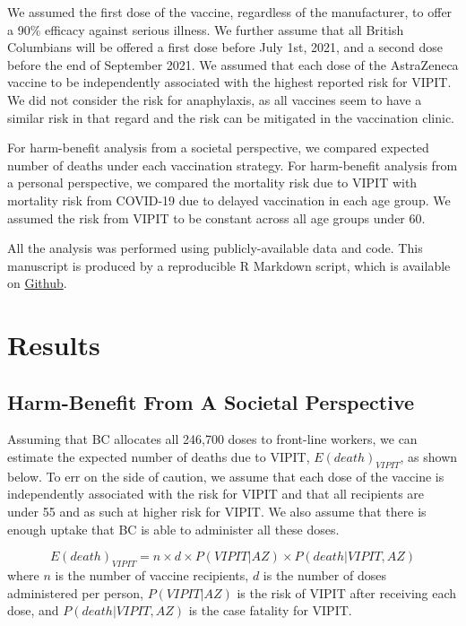 \documentclass[]{interact}
\theoremstyle{plain}%
\theoremstyle{definition}
\theoremstyle{remark}
\begin{document}
We assumed the first dose of the vaccine, regardless of the
manufacturer, to offer a 90\% efficacy against serious illness. We
further assume that all British Columbians will be offered a first dose
before July 1st, 2021, and a second dose before the end of September
2021. We assumed that each dose of the AstraZeneca vaccine to be
independently associated with the highest reported risk for VIPIT. We
did not consider the risk for anaphylaxis, as all vaccines seem to have
a similar risk in that regard and the risk can be mitigated in the
vaccination clinic.

For harm-benefit analysis from a societal perspective, we compared
expected number of deaths under each vaccination strategy. For
harm-benefit analysis from a personal perspective, we compared the
mortality risk due to VIPIT with mortality risk from COVID-19 due to
delayed vaccination in each age group. We assumed the risk from VIPIT to
be constant across all age groups under 60.

All the analysis was performed using publicly-available data and code.
This manuscript is produced by a reproducible R Markdown script, which
is available on
\href{https://github.com/aminadibi/astrazenecaVIPIT}{Github}.

\hypertarget{results}{%
\section{Results}\label{results}}

\hypertarget{harm-benefit-from-a-societal-perspective}{%
\subsection{Harm-Benefit From A Societal
Perspective}\label{harm-benefit-from-a-societal-perspective}}

Assuming that BC allocates all 246,700 doses to front-line workers, we
can estimate the expected number of deaths due to VIPIT,
\(E(death)_{VIPIT}\), as shown below. To err on the side of caution, we
assume that each dose of the vaccine is independently associated with
the risk for VIPIT and that all recipients are under 55 and as such at
higher risk for VIPIT. We also assume that there is enough uptake that
BC is able to administer all these doses.

\[
E(death)_{VIPIT}  = n \times d \times P(VIPIT|AZ) \times P(death|VIPIT, AZ)
\] where \(n\) is the number of vaccine recipients, \(d\) is the number
of doses administered per person, \(P(VIPIT|AZ)\) is the risk of VIPIT
after receiving each dose, and \(P(death|VIPIT, AZ)\) is the case
fatality for VIPIT.
\end{document}
